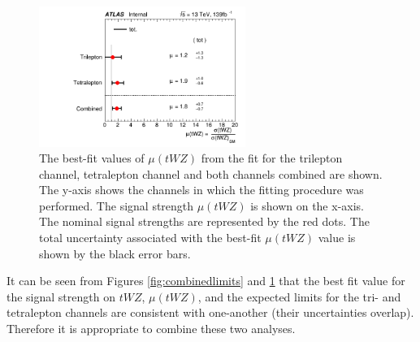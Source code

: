 \begin{figure}
    \centering
    \includegraphics[width=0.6\textwidth]{figures/combined/POI_SigXsecOverSM_.png}
       \caption{The best-fit values of $\mu (tWZ)$ from the fit for the trilepton channel, tetralepton channel and both channels combined are shown. The y-axis shows the channels in which the fitting procedure was performed. The signal strength $\mu (tWZ)$ is shown on the x-axis. The nominal signal strengths are represented by the red dots. The total uncertainty associated with the best-fit $\mu (tWZ)$ value is shown by the black error bars.}
        \label{fig:combinedPOI}
\end{figure}
It can be seen from Figures \ref{fig:combinedlimits} and  \ref{fig:combinedPOI} that the best fit value for the signal strength on $tWZ$, $\mu (tWZ)$, and the expected limits for the tri- and tetralepton channels are consistent with one-another (their uncertainties overlap). Therefore it is appropriate to combine these two analyses.\\

